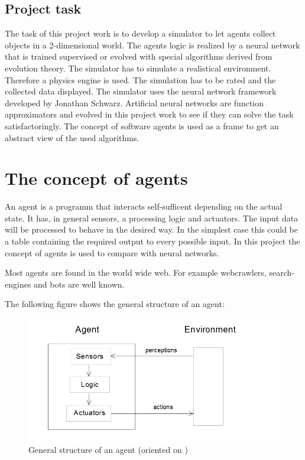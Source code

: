 \documentclass[10pt,a4paper,DIV=11]{scrreprt}
\begin{document}
\section{Project task}
The task of this project work is to develop a simulator to let agents collect objects in a 2-dimensional world. The agents logic is realized  by a neural network that is trained supervised or evolved with special algorithms derived from evolution theory.
The simulator has to simulate a realistical environment. Therefore a physics engine is used.
The simulation has to be rated and the collected data displayed. The simulator uses the neural network framework developed by Jonathan Schwarz.
Artificial neural networks are function approximators and evolved in this project work to see if they can solve the task satisfactoringly.
The concept of software agents is used as a frame to get an abstract view of the used algorithms. \\




\chapter{The concept of agents}
An agent is a programm that interacts self-sufficent depending on the actual state. It has, in general sensors, a processing logic and actuators. The input data will be processed to behave in the desired way. In the simplest case this could be a table containing the required output to every possible input. In this project the concept of agents is used to compare with neural networks.

Most agents are found in the world wide web. For example webcrawlers, search-engines and bots are well known.

The following figure shows the general structure of an agent:


\begin{center}
	\begin{figure}[H]
		\centering
		\includegraphics[width=1.0\textwidth,scale=1]{files/agent.png}  
		\caption{General structure of an agent (oriented on \cite{ki-book} )} 
		\label{fig:agent}
	\end{figure}
\end{center}
\end{document}
